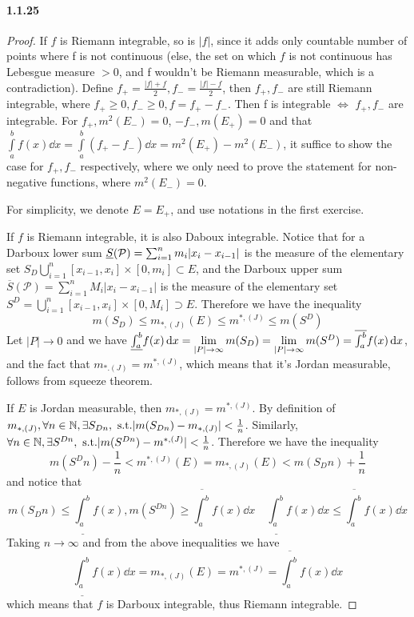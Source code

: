 \documentclass{article}
\begin{document}
\paragraph{1.1.25}
\begin{proof}
If $f$ is Riemann integrable, so is $|f|$, since it adds only countable number of points where f is not continuous (else, the set on which $f$ is not continuous has Lebesgue measure $>0$, and f wouldn't be Riemann measurable, which is a contradiction).  Define $f_+=\frac{|f|+f}{2},f_-=\frac{|f|-f}{2}$, then $f_+,f_-$ are still Riemann integrable, where $f_+\geq 0,f_-\geq 0,f=f_+-f_-$. Then f is integrable $\Leftrightarrow$ $f_+,f_-$ are integrable. For $f_+,m^2(E_-)=0$, $-f_-,m(E_+)=0$ and that $\int\limits_a^b f(x)\dd x=\int\limits_a^b (f_+-f_-)\dd x=m^2(E_+)-m^2(E_-)$, it suffice to show the case for $f_+,f_-$ respectively, where we only need to prove the statement for non-negative functions, where $m^2(E_-)=0$.

For simplicity, we denote $E=E_+$, and use notations in the first exercise.

If $f$ is Riemann integrable, it is also Daboux integrable. Notice that for a Darboux lower sum $\uline{S}(\mathcal P)=\sum_{i=1}^{n}m_i|x_i-x_{i-1}|$ is the measure of the elementary set $S_D\bigcup\limits_{i=1}^{n}[x_{i-1},x_{i}]\times [0,m_i]\subset E$, and the Darboux upper sum $\overline{S}(\mathcal P)=\sum_{i=1}^{n}M_i|x_i-x_{i-1}|$ is the measure of the elementary set $S^D=\bigcup\limits_{i=1}^{n}[x_{i-1},x_{i}]\times [0,M_i]\supset E$. Therefore we have the inequality
\[m(S_D)\leq m_{*,(J)}(E)\leq m^{*,(J)}\leq m(S^D)\]
Let $|P|\to 0$ and we have $\uline{\int_a^b}f(x)\dd x=\lim\limits_{|P|\to\infty}m(S_D)=\lim\limits_{|P|\to\infty}m(S^D)=\overline{\int_a^b}f(x)\dd x$, and the fact that $m_{*.(J)}=m^{*,(J)}$, which means that it's Jordan measurable, follows from squeeze theorem.

If $E$ is Jordan measurable, then $m_{*,(J)}=m^{*,(J)}$. By definition of $m_{*,(J)}, \forall n\in\mathbb{N},\exists S_{Dn},\text{ s.t.} |m(S_{Dn})-m_{*,(J)}|<\frac 1 n$. Similarly, $\forall n\in\mathbb{N},\exists S^{Dn},\text{ s.t.} |m(S^{Dn})-m^{*,(J)}|<\frac 1 n$. Therefore we have the inequality
\[m(S^Dn)-\frac 1 n<m^{*,(J)}(E)=m_{*,(J)}(E)<m(S_Dn)+\frac 1 n\]
and notice that 
\[m(S_Dn)\leq \underline{\int_a^b}f(x), m(S^{Dn})\geq  \overline{\int_a^b}f(x)\dd x\quad \underline{\int_a^b}f(x)\dd x\leq \overline{\int_a^b}f(x)\dd x \]
Taking $n\to\infty$ and from the above inequalities we have 
\[\underline{\int_a^b}f(x)\dd x=m_{*,(J)}(E)=m^{*,(J)}=\overline{\int_a^b}f(x)\dd x\]
which means that $f$ is Darboux integrable, thus Riemann integrable.
\end{proof}
\end{document}
